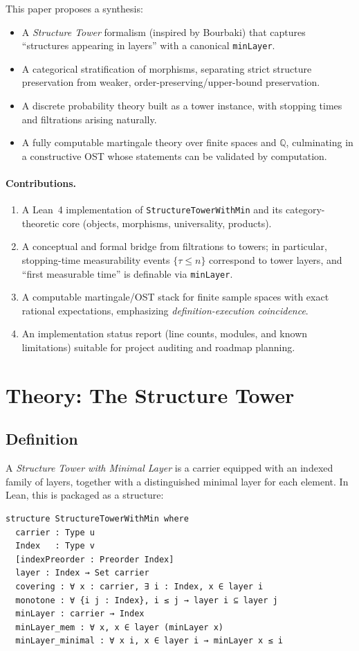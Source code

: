 \documentclass[11pt]{article}
\newcommand{\QQ}{\mathbb{Q}}
\begin{document}
This paper proposes a synthesis:
\begin{itemize}[leftmargin=1.2em]
\item A \emph{Structure Tower} formalism (inspired by Bourbaki) that captures ``structures appearing in layers'' with a canonical \texttt{minLayer}.
\item A categorical stratification of morphisms, separating strict structure preservation from weaker, order-preserving/upper-bound preservation.
\item A discrete probability theory built as a tower instance, with stopping times and filtrations arising naturally.
\item A fully computable martingale theory over finite spaces and $\QQ$, culminating in a constructive OST whose statements can be validated by computation.
\end{itemize}

\paragraph{Contributions.}
\begin{enumerate}[leftmargin=1.2em]
\item A Lean~4 implementation of \texttt{StructureTowerWithMin} and its category-theoretic core (objects, morphisms, universality, products).
\item A conceptual and formal bridge from filtrations to towers; in particular, stopping-time measurability events $\{\tau\le n\}$ correspond to tower layers, and ``first measurable time'' is definable via \texttt{minLayer}.
\item A computable martingale/OST stack for finite sample spaces with exact rational expectations, emphasizing \emph{definition-execution coincidence}.
\item An implementation status report (line counts, modules, and known limitations) suitable for project auditing and roadmap planning.
\end{enumerate}

\section{Theory: The Structure Tower}
\subsection{Definition}
A \emph{Structure Tower with Minimal Layer} is a carrier equipped with an indexed family of layers, together with a distinguished minimal layer for each element. In Lean, this is packaged as a structure:
\begin{lstlisting}
structure StructureTowerWithMin where
  carrier : Type u
  Index   : Type v
  [indexPreorder : Preorder Index]
  layer : Index → Set carrier
  covering : ∀ x : carrier, ∃ i : Index, x ∈ layer i
  monotone : ∀ {i j : Index}, i ≤ j → layer i ⊆ layer j
  minLayer : carrier → Index
  minLayer_mem : ∀ x, x ∈ layer (minLayer x)
  minLayer_minimal : ∀ x i, x ∈ layer i → minLayer x ≤ i
\end{lstlisting}
\end{document}
